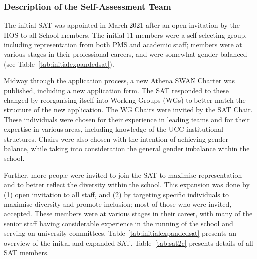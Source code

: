 \subsubsection{Description of the Self-Assessment Team}
The initial SAT  was appointed in March 2021 after an open invitation by the \ac{HOS} to all School members.
The initial 11 members were a self-selecting group, including representation from both PMS and academic staff; members were at various stages in their professional careers, and were somewhat gender balanced (see Table~\ref{tab:initialexpandedsat}).

Midway through the application process, a new Athena SWAN Charter was published, including a new application form. 
The SAT responded to these changed by reorganising itself into Working Groups (WGs) to better match the structure of the new application. The WG Chairs were invited by the SAT Chair. These individuals were chosen for their experience in leading teams and for their expertise in various areas, including knowledge of the UCC institutional structures. Chairs were also chosen with the intention of achieving gender balance, while taking into consideration the general gender imbalance within the school.

Further, more people were invited 
to join the SAT to maximise representation and to better reflect the  diversity within the school. This expansion was done by (1) open invitation to all staff, %
and (2) by targeting specific individuals to maximise diversity and promote inclusion; most of those who were invited, accepted. 
These members were at various stages in their career, with many of the senior staff having considerable experience in the running of the school and serving on university committees.
Table~\ref{tab:initialexpandedsat} presents an overview of the initial and expanded SAT.
Table~\ref{tab:sat2c} presents details of all SAT members.



